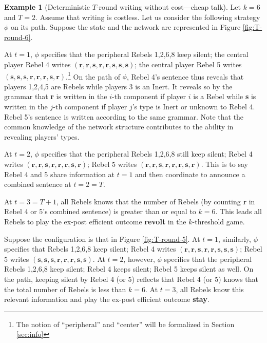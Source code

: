 \documentclass[12pt,letter]{article}
\theoremstyle{definition}
\newtheorem{example}{Example}
\theoremstyle{remark}
\theoremstyle{claim}
\begin{document}
%
\begin{example}[Deterministic $T$-round writing without cost---cheap talk]
\label{ex:cheap_talk}
Let $k=6$ and $T=2$. Assume that writing is costless. Let us consider the following strategy $\phi$ on its path. Suppose the state and the network are represented in Figure \ref{fig:T-round-6}. 

At $t=1$, $\phi$ specifies that the peripheral Rebels 1,2,6,8 keep silent; the central player Rebel 4 writes $(\textbf{r},\textbf{r},\textbf{s},\textbf{r},\textbf{r},\textbf{s},\textbf{s},\textbf{s})$; the central player Rebel 5 writes $(\textbf{s},\textbf{s},\textbf{s},\textbf{r},\textbf{r},\textbf{r},\textbf{s},\textbf{r})$.\footnote{The notion of ``peripheral'' and ``center'' will be formalized in Section \ref{sec:info}} On the path of $\phi$, Rebel 4's sentence thus reveals that players 1,2,4,5 are Rebels while players 3 is an Inert. It reveals so by the grammar that \textbf{r} is written in the $i$-th component if player $i$ is a Rebel while  \textbf{s} is written in the $j$-th component if player $j$'s type is Inert or unknown to Rebel 4. Rebel 5's sentence is written according to the same grammar. Note that the common knowledge of the network structure contributes to the ability in revealing players' types. 

At $t=2$, $\phi$ specifies that the peripheral Rebels 1,2,6,8 still keep silent; Rebel 4 writes $(\textbf{r},\textbf{r},\textbf{s},\textbf{r},\textbf{r},\textbf{r},\textbf{s},\textbf{r})$; Rebel 5 writes $(\textbf{r},\textbf{r},\textbf{s},\textbf{r},\textbf{r},\textbf{r},\textbf{s},\textbf{r})$. This is to say Rebel 4 and 5 share information at $t=1$ and then coordinate to announce a combined sentence at $t=2=T$. 

At $t=3=T+1$, all Rebels knows that the number of Rebels (by counting \textbf{r} in Rebel 4 or 5's combined sentence) is greater than or equal to $k=6$. This leads all Rebels to play the ex-post efficient outcome \textbf{revolt} in the $k$-threshold game. 

Suppose the configuration is that in Figure \ref{fig:T-round-5}. At $t=1$, similarly, $\phi$ specifies that Rebels 1,2,6,8 keep silent; Rebel 4 writes $(\textbf{r},\textbf{r},\textbf{s},\textbf{r},\textbf{r},\textbf{s},\textbf{s},\textbf{s})$; Rebel 5 writes $(\textbf{s},\textbf{s},\textbf{s},\textbf{r},\textbf{r},\textbf{r},\textbf{s},\textbf{s})$. At $t=2$, however, $\phi$ specifies that the peripheral Rebels 1,2,6,8 keep silent; Rebel 4 keeps silent; Rebel 5 keeps silent as well. On the path, keeping silent by Rebel 4 (or 5) reflects that Rebel 4 (or 5) knows that the total number of Rebels is less than $k=6$. At $t=3$, all Rebels know this relevant information and play the ex-post efficient outcome \textbf{stay}.


\end{example}
\end{document}
